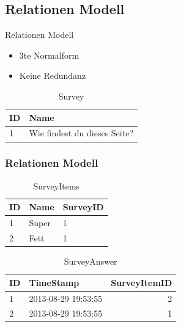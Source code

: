 \documentclass[xcolor=dvipsnames]{beamer}
\begin{document}
\subsection{Relationen Modell}
\begin{frame} %

	\begin{block}{Relationen Modell}		
		\begin{itemize}[]
			\item 3te Normalform
			\item Keine Redundanz
		\end{itemize}
	\end{block}


\begin{table}
\begin{tabular}{|l|l|} \hline\hline
\textbf{ID} & \textbf{Name} \\
\hline
1 & Wie findest du dieses Seite? \\
\hline\hline
\end{tabular}
\caption{Survey}
\end{table}

\end{frame}


\begin{frame} %
  \frametitle{Relationen Modell} %
\begin{table}
\begin{tabular}{|l|l|l|} \hline\hline
\textbf{ID} & \textbf{Name} & \textbf{SurveyID}\\
\hline
1 & Super & 1 \\
2 & Fett & 1 \\
\hline\hline
\end{tabular}
\caption{SurveyItems}
\end{table}



\begin{table}
\begin{tabular}{|l|l|r|} \hline\hline
\textbf{ID} & \textbf{TimeStamp}  & \textbf{SurveyItemID}\\
\hline
1 & 2013-08-29 19:53:55 & 2 \\
2 & 2013-08-29 19:53:55 & 1 \\
\hline\hline
\end{tabular}
\caption{SurveyAnswer}
\end{table}

\end{frame}
\end{document}
